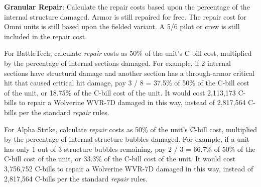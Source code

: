 \item {\bfseries Granular Repair}: Calculate the repair costs based upon the percentage of the internal structure damaged.
Armor is still repaired for free.
The repair cost for Omni units is still based upon the fielded variant.
A 5/6 pilot or crew is still included in the repair cost.

For BattleTech, calculate \emph{repair} costs as 50\% of the unit's C-bill cost, multiplied by the percentage of internal sections damaged.
For example, if 2 internal sections have structural damage and another section has a through-armor critical hit that caused critical hit damage, pay 3 / 8 = 37.5\% of 50\% of the C-bill cost of the unit, or 18.75\% of the C-bill cost of the unit.
It would cost 2,113,173 C-bills to repair a Wolverine WVR-7D damaged in this way, instead of 2,817,564 C-bills per the standard \emph{repair} rules.

For Alpha Strike, calculate \emph{repair} costs as 50\% of the unit's C-bill cost, multiplied by the percentage of internal structure bubbles damaged.
For example, if a unit has only 1 out of 3 structure bubbles remaining, pay 2 / 3 = 66.7\% of 50\% of the C-bill cost of the unit, or 33.3\% of the C-bill cost of the unit.
It would cost 3,756,752 C-bills to repair a Wolverine WVR-7D damaged in this way, instead of 2,817,564 C-bills per the standard \emph{repair} rules.
